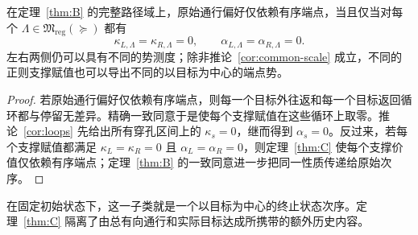 \begin{corollary}[仅依赖端点的子类]\label{cor:endpoint-class}
在定理~\ref{thm:B} 的完整路径域上，原始通行偏好仅依赖有序端点，当且仅当对每个 $\Lambda\in\mathfrak M_{\mathrm{reg}}(\succeq)$ 都有
\[
 \kappa_{L,\Lambda}=\kappa_{R,\Lambda}=0,
 \qquad
 \alpha_{L,\Lambda}=\alpha_{R,\Lambda}=0.
\]
左右两侧仍可以具有不同的势测度；除非推论~\ref{cor:common-scale} 成立，不同的正则支撑赋值也可以导出不同的以目标为中心的端点势。
\end{corollary}

\begin{proof}
若原始通行偏好仅依赖有序端点，则每一个目标外往返和每一个目标返回循环都与停留无差异。精确一致同意于是使每个支撑赋值在这些循环上取零。推论~\ref{cor:loops} 先给出所有穿孔区间上的 $\kappa_s=0$，继而得到 $\alpha_s=0$。反过来，若每个支撑赋值都满足 $\kappa_L=\kappa_R=0$ 且 $\alpha_L=\alpha_R=0$，则定理~\ref{thm:C} 使每个支撑价值仅依赖有序端点；定理~\ref{thm:B} 的一致同意进一步把同一性质传递给原始次序。
\end{proof}

在固定初始状态下，这一子类就是一个以目标为中心的终止状态次序。定理~\ref{thm:C} 隔离了由总有向通行和实际目标达成所携带的额外历史内容。
